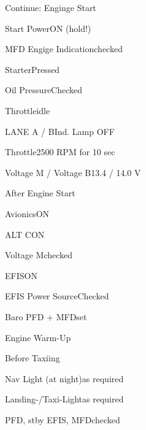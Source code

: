 \begin{checklist}{Continue: Enginge Start}
  \item{Start Power}{ON (hold!)}
  \item{MFD Engige Indication}{checked}
  \item{Starter}{Pressed}
  \item{Oil Pressure}{Checked}
  \item{Throttle}{idle}
  \item{LANE A / B}{Ind. Lamp OFF}
  \item{Throttle}{2500 RPM for 10 sec}
  \item{Voltage M / Voltage B}{13.4 / 14.0 V}
\end{checklist}

\begin{checklist}{After Engine Start}
  \item{Avionics}{ON}
  \item{ALT C}{ON}
  \item{Voltage M}{checked}
  \item{EFIS}{ON}
  \item{EFIS Power Source}{Checked}
  \item{Baro PFD + MFD}{set}
\end{checklist}

\begin{checklist}{Engine Warm-Up}
\end{checklist}

\begin{checklist}{Before Taxiing}
  \item{Nav Light (at night)}{as required}
  \item{Landing-/Taxi-Light}{as required}
  \item{PFD, stby EFIS, MFD}{checked}
\end{checklist}

